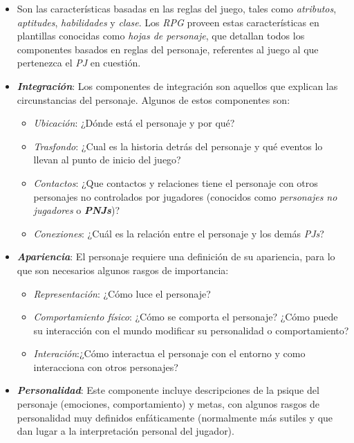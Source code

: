 \begin{itemize}
    \item Son las características basadas en las reglas del juego, tales como 
    \textit{atributos}, \textit{aptitudes}, \textit{habilidades} y \textit{clase}. Los \textit{RPG} proveen estas características 
    en plantillas conocidas como \textit{hojas de personaje}, que detallan todos los componentes basados en reglas del personaje, 
    referentes al juego al que pertenezca el \textit{PJ} en cuestión.
    
    \item \textbf{\textit{Integración}}: Los componentes de integración son aquellos que explican las 
    circunstancias del personaje. Algunos de estos componentes son:
    
    \begin{itemize}
        \item \textit{Ubicación}: ¿Dónde está el personaje y por qué?
        
        \item \textit{Trasfondo}: ¿Cual es la historia detrás del personaje y qué eventos lo llevan al 
        punto de inicio del juego?

        \item \textit{Contactos}: ¿Que contactos y relaciones tiene el personaje con otros personajes no controlados por 
        jugadores (conocidos como \textit{personajes no jugadores} o \textbf{\textit{PNJs}})?

        \item \textit{Conexiones}: ¿Cuál es la relación entre el personaje y los demás \textit{PJs}?
    \end{itemize}

    \item \textbf{\textit{Apariencia}}: El personaje requiere una definición de su apariencia, para lo que son necesarios 
    algunos rasgos de importancia:

    \begin{itemize}    
        \item \textit{Representación}: ¿Cómo luce el personaje?
    
        \item \textit{Comportamiento físico}: ¿Cómo se comporta el personaje? ¿Cómo puede su interacción con el mundo 
        modificar su personalidad o comportamiento?
        
        \item \textit{Interación}:¿Cómo interactua el personaje con el entorno y como interacciona con otros personajes?
    \end{itemize}   

    \item \textbf{\textit{Personalidad}}: Este componente incluye descripciones de la psique del personaje (emociones, 
    comportamiento) y metas, con algunos rasgos de personalidad muy definidos enfáticamente (normalmente más sutiles y 
    que dan lugar a la interpretación personal del jugador).
\end{itemize}

